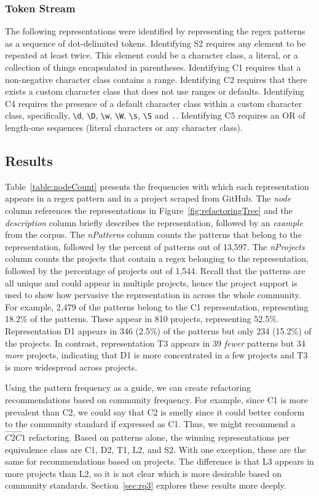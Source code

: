 \subsubsection{Token Stream }
The following representations were identified by representing the regex patterns as a sequence of dot-delimited tokens.
Identifying S2 requires any element to be repeated at least twice. This element could be a character class, a literal, or a collection of things encapsulated in parentheses.
Identifying C1 requires that a non-negative character class contains a range.  Identifying C2 requires that there exists a custom character class that does not use ranges or defaults. Identifying C4 requires the presence of a default character class within a custom character class, specifically, \verb!\d!, \verb!\D!, \verb!\w!, \verb!\W!, \verb!\s!, \verb!\S! and \verb!.!.  Identifying C5 requires an OR of length-one sequences (literal characters or any character class).


\subsection{Results}
Table~\ref{table:nodeCount} presents the frequencies with which each representation appears in a regex pattern and in a project scraped from GitHub. The \emph{node} column references the representations in Figure~\ref{fig:refactoringTree} and the \emph{description} column briefly describes the representation, followed by an \emph{example} from the corpus. The \emph{nPatterns} column counts the patterns that belong to the representation, followed by the percent of patterns out of 13,597.
The \emph{nProjects} column counts the projects that contain a regex belonging to the representation,
followed by the percentage of projects out of 1,544.
Recall that the patterns are all unique and could appear in multiple projects, hence the project support is used to show how pervasive the representation in across the whole community.
For example, 2,479 of the patterns belong to the C1 representation, representing 18.2\% of the patterns. These appear in 810 projects, representing 52.5\%.
 Representation D1 appears in 346 (2.5\%) of the patterns but only 234 (15.2\%) of the projects. In contrast, representation T3 appears in 39 \emph{fewer} patterns but 34 \emph{more} projects, indicating that D1 is more concentrated in a few projects and T3 is more widespread across projects.

Using the pattern frequency as a guide, we can create refactoring recommendations based on community frequency. For example, since C1 is more prevalent than C2, we could say that C2 is smelly since it could better conform to the community standard if expressed as C1. Thus, we might recommend a $\overrightarrow{C2C1}$ refactoring. Based on patterns alone, the winning representations per equivalence class are C1, D2, T1, L2, and S2. With one exception, these are the same for recommendations based on projects. The difference is that L3 appears in more projects than L2, so it is not clear which is more desirable based on community standards. 
Section~\ref{sec:rq3} explores these results more deeply.

